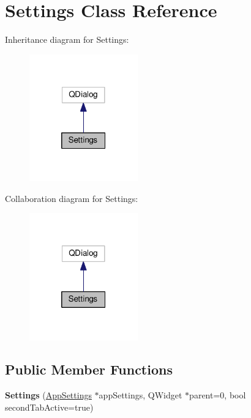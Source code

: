 \hypertarget{class_settings}{}\section{Settings Class Reference}
\label{class_settings}


Inheritance diagram for Settings\+:
\nopagebreak
\begin{figure}[H]
\begin{center}
\leavevmode
\includegraphics[width=133pt]{class_settings__inherit__graph}
\end{center}
\end{figure}


Collaboration diagram for Settings\+:
\nopagebreak
\begin{figure}[H]
\begin{center}
\leavevmode
\includegraphics[width=133pt]{class_settings__coll__graph}
\end{center}
\end{figure}
\subsection*{Public Member Functions}
\begin{DoxyCompactItemize}
\item 
{\bfseries Settings} (\hyperlink{class_app_settings}{App\+Settings} $\ast$app\+Settings, Q\+Widget $\ast$parent=0, bool second\+Tab\+Active=true)\hypertarget{class_settings_ac56c60bd486d5c3375de82f1263ed4ee}{}\label{class_settings_ac56c60bd486d5c3375de82f1263ed4ee}

\end{DoxyCompactItemize}


